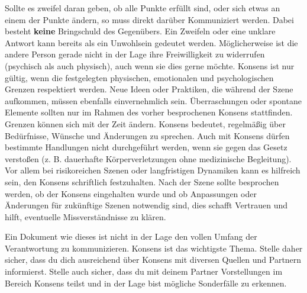 \documentclass[a4paper,12pt]{article}
\begin{document}
Sollte es zweifel daran geben, ob alle Punkte erfüllt sind, oder sich etwas an einem der Punkte ändern, so muss direkt darüber Kommuniziert werden. Dabei besteht \textbf{keine} Bringschuld des Gegenübers. Ein Zweifeln oder eine unklare Antwort kann bereits als ein Unwohlsein gedeutet werden. Möglicherweise ist die andere Person gerade nicht in der Lage ihre Freiwilligkeit zu widerrufen (psychisch als auch physisch), auch wenn sie dies gerne möchte. Konsens ist nur gültig, wenn die festgelegten physischen, emotionalen und psychologischen Grenzen respektiert werden. Neue Ideen oder Praktiken, die während der Szene aufkommen, müssen ebenfalls einvernehmlich sein. Überraschungen oder spontane Elemente sollten nur im Rahmen des vorher besprochenen Konsens stattfinden. Grenzen können sich mit der Zeit ändern. Konsens bedeutet, regelmäßig über Bedürfnisse, Wünsche und Änderungen zu sprechen. Auch mit Konsens dürfen bestimmte Handlungen nicht durchgeführt werden, wenn sie gegen das Gesetz verstoßen (z. B. dauerhafte Körperverletzungen ohne medizinische Begleitung). Vor allem bei risikoreichen Szenen oder langfristigen Dynamiken kann es hilfreich sein, den Konsens schriftlich festzuhalten. Nach der Szene sollte besprochen werden, ob der Konsens eingehalten wurde und ob Anpassungen oder Änderungen für zukünftige Szenen notwendig sind, dies schafft Vertrauen und hilft, eventuelle Missverständnisse zu klären.

Ein Dokument wie dieses ist nicht in der Lage den vollen Umfang der Verantwortung zu kommunizieren. Konsens ist das wichtigste Thema. Stelle daher sicher, dass du dich ausreichend über Konsens mit diversen Quellen und Partnern informierst. Stelle auch sicher, dass du mit deinem Partner Vorstellungen im Bereich Konsens teilst und in der Lage bist mögliche Sonderfälle zu erkennen.\bigbreak
\end{document}
